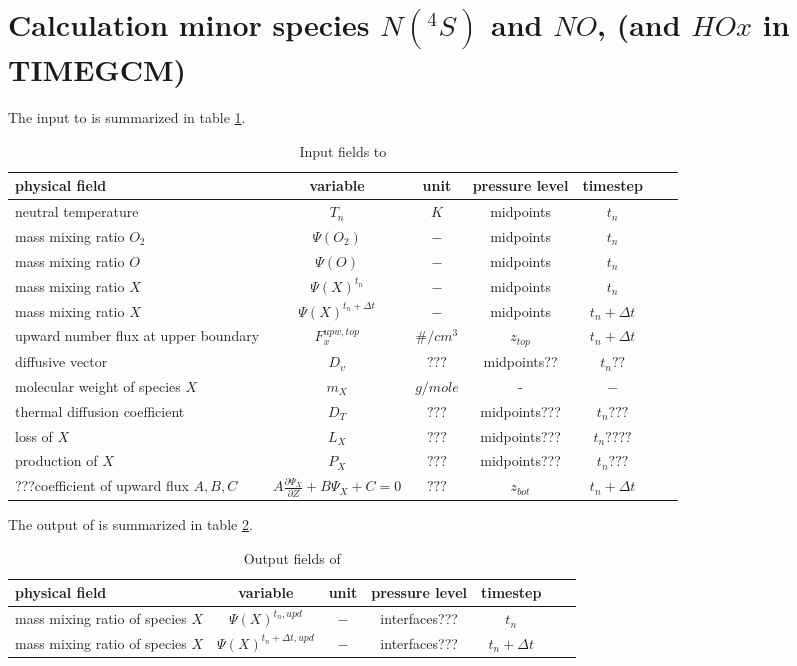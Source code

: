 %
\section{Calculation minor species $N(^4S)$ and $NO$, (and $HOx$ in TIMEGCM) }\label{cap:minor}
%
The input to  is summarized in table
\ref{tab:input_minor}.
%
\begin{table}[tb]
\begin{tabular}{|p{3.5cm} ||c|c|c|c|c|c|} \hline
physical field               & variable        & unit&pressure
level& timestep
\\ \hline \hline
%
neutral temperature &       $T_n$              & $K$   &  midpoints & $t_n$\\
mass mixing ratio $O_2$ &   $\Psi(O_2)$        & $-$   &  midpoints & $t_n$\\
mass mixing ratio $O$   &   $\Psi(O)$          & $-$   &  midpoints & $t_n$\\
mass mixing ratio $X$   &   $\Psi(X)^{t_n}$    & $-$   &  midpoints & $t_n$\\
mass mixing ratio $X$   &   $\Psi(X)^{t_n+\Delta t}$ & $-$   &  midpoints & $t_n+ \Delta t$\\
upward number flux at upper boundary &       $F_x^{upw,top}$              & $\#/cm^3$   &  $z_{top}$ & $t_n+\Delta t$\\
diffusive vector &       $D_v$              & $???$   &  midpoints?? & $t_n??$\\
molecular weight of species $X$ &       $m_X$              & $g/mole$   &  - & $-$\\
thermal diffusion coefficient &       $D_T$              & $???$   &  midpoints??? & $t_n???$\\
loss of $X$ &       $L_X$              & $???$   &  midpoints??? & $t_n????$\\
production of $X$&       $P_X$              & $???$   &  midpoints??? & $t_n???$\\
???coefficient of upward flux $A,B, C$ &
        $A \frac{\partial \Psi_X}{\partial Z}+ B \Psi_X + C = 0$              & $???$   &  $z_{bot}$ & $t_n+\Delta t$
 \\ \hline
\end{tabular}
\caption{Input fields to }
\label{tab:input_minor}
\end{table}
%
The output of  is summarized in table
\ref{tab:output_minor}.
%
\begin{table}[tb]
\begin{tabular}{|p{3.5cm} ||c|c|c|c|c|c|} \hline
physical field               & variable        & unit&pressure
level& timestep \\ \hline \hline mass mixing ratio of species $X$ &
$\Psi(X)^{t_n,upd}$ & $-$ & interfaces??? & $t_n$ \\
mass mixing ratio of species $X$ & $\Psi(X)^{t_n+\Delta t,upd}$ &
$-$ & interfaces??? & $t_n+\Delta t$
\\ \hline \hline
\end{tabular}
\caption{Output fields of }
\label{tab:output_minor}
\end{table}
